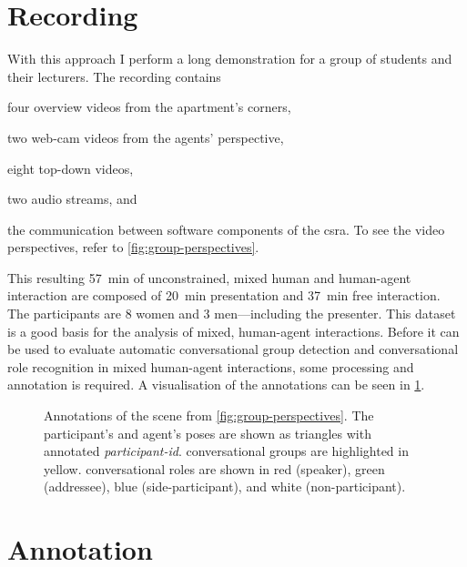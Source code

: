 \section{Recording}

With this approach I perform a long demonstration for a group of students and their lecturers.
The recording contains 
\begin{enumerate*}[label=(\arabic*)]
    \item four overview videos from the \gls{apartment}'s corners,
    \item two web-cam videos from the agents' perspective, 
    \item eight top-down videos,
    \item two audio streams, and 
    \item the communication between software components of the \gls{csra}.
To see the video perspectives, refer to \cref{fig:group-perspectives}.
\end{enumerate*}
This resulting \SI{57}{\minute} of unconstrained, mixed human and human-agent interaction are composed of \SI{20}{\minute} presentation and \SI{37}{\minute} free interaction. 
The participants are 8 women and 3 men---including the presenter.
This dataset is a good basis for the analysis of mixed, human-agent interactions.
Before it can be used to evaluate automatic \gls{conversational group} detection and \gls{conversational role} recognition in mixed human-agent interactions, some processing and annotation is required.
A visualisation of the annotations can be seen in \cref{fig:map-annotation}.
\begin{figure}[htb]
  \centering
    \def\svgwidth{\textwidth}
    
    \caption[Group and role annotations.]{\label{fig:map-annotation}
    Annotations of the scene from \cref{fig:group-perspectives}.
    The participant's and agent's poses are shown as triangles with annotated \emph{participant-id}.
    \Glspl{conversational group} are highlighted in yellow.
    \Glspl{conversational role} are shown in red (\gls{speaker}), green (\gls{addressee}), blue (\gls{side-participant}), and white (\gls{non-participant}).
    }
\end{figure}

\section{Annotation}

